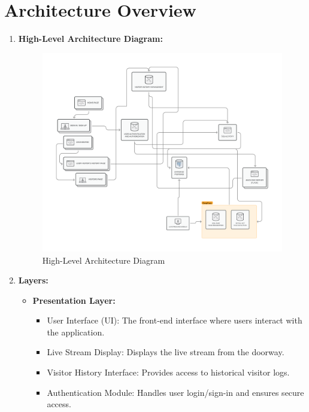 \documentclass[a4 paper, 12pt]{article}
\begin{document}
\section{Architecture Overview}
\begin{enumerate}
    \item \textbf{High-Level Architecture Diagram:}
\begin{figure}[h]
  \centering
  \includegraphics[width=1\textwidth]{images/Architecture Diagram.png}
  \caption{High-Level Architecture Diagram}
  \label{fig:your_image}
\end{figure}
    \item \textbf{Layers:}
        \begin{itemize}
            \item \textbf{Presentation Layer:}
                \begin{itemize}
                    \item User Interface (UI): The front-end interface where users interact with the application.
                    \item Live Stream Display: Displays the live stream from the doorway.
                    \item Visitor History Interface: Provides access to historical visitor logs.
                    \item Authentication Module: Handles user login/sign-in and ensures secure access.
                \end{itemize}
            

\end{itemize}
\end{enumerate}
\end{document}

